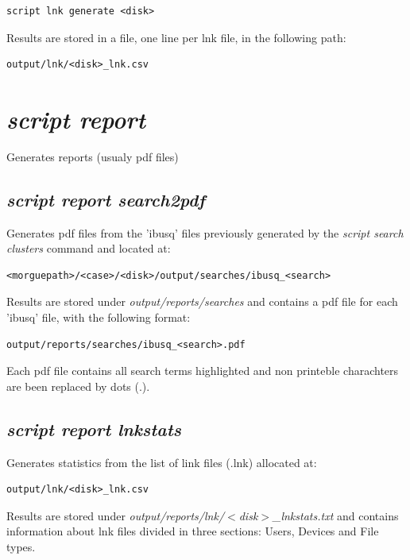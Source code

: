 \documentclass[a4paper,11pt,oneside]{report}
\begin{document}
\begin{verbatim}
script lnk generate <disk>
\end{verbatim}

Results are stored in a file, one line per lnk file, in the following path:

\begin{verbatim}
output/lnk/<disk>_lnk.csv
\end{verbatim}


\section{\emph{script report}}

Generates reports (usualy pdf files)

\subsection{\emph{script report search2pdf}} 

Generates pdf files from the 'ibusq' files previously generated by the  \emph{script search clusters} command and located at:

\begin{verbatim}
<morguepath>/<case>/<disk>/output/searches/ibusq_<search>
\end{verbatim}

Results are stored under \emph{output/reports/searches} and contains a pdf file for each 'ibusq' file, with the following format:

\begin{verbatim}
output/reports/searches/ibusq_<search>.pdf
\end{verbatim}

Each pdf file contains all search terms highlighted and non printeble charachters are been replaced by dots (.).

\subsection{\emph{script report lnkstats}}

Generates statistics from the list of link files (.lnk) allocated at:
\begin{verbatim}
output/lnk/<disk>_lnk.csv
\end{verbatim}

Results are stored under \emph{output/reports/lnk/$<$disk$>$\_lnkstats.txt} and contains information about lnk files divided in three sections: Users, Devices and File types.
\end{document}
